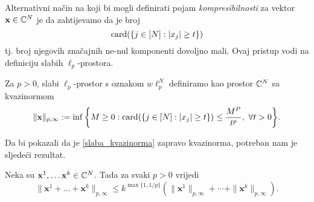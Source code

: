 \documentclass[a4paper,twoside,12pt]{memoir} %
\newcommand{\vect}[1]{\mathbf{#1}}
\renewcommand{\vec}{\vect}
\newcommand{\card}{\text{\normalfont{card}}}
\begin{document}
\indent Alternativni na\v{c}in na koji bi mogli definirati pojam \textit{kompresibilnosti} za vektor $\vec{x}\in\C^N$ je da zahtijevamo da je broj
$$\card(\{j\in[N]:|x_j|\geq t\})$$
tj. broj njegovih zna\v{c}ajnih ne-nul komponenti dovoljno mali. Ovaj pristup vodi na definiciju slabih $\ell_p$-prostora.
\begin{defn}
Za $p>0$, slabi $\ell_p$-prostor s oznakom $w\ell_p^N$ definiramo kao prostor $\mathbb{C}^N$ sa kvazinormom
\begin{equation}\label{slaba_kvazinorma}
    \|\vec{x}\|_{p, \infty}:=\inf\bigg\{ M \geq 0: \card (\{j\in [N]: |x_j|\geq t \})\leq \frac{M^P}{t^p},\ \forall t>0    \bigg\}.
\end{equation}
\end{defn}
\noindent
Da bi pokazali da je \eqref{slaba_kvazinorma} zapravo kvazinorma, potreban nam je sljede\'ci rezultat.
\begin{prop}
    Neka su $\vec{x}^1,\dots\vec{x}^k\in\C^N$. Tada za svaki $p>0$ vrijedi 
    \begin{equation*}
    \|\vec{x}^1+\dots+\vec{x}^k\|_{p,\infty} \leq k^{\max\{1, 1/p\}}(\|\vec{x}^1\|_{p, \infty} + \cdots + \|\vec{x}^k\|_{p, \infty}).
    \end{equation*}
\end{prop}
\end{document}
